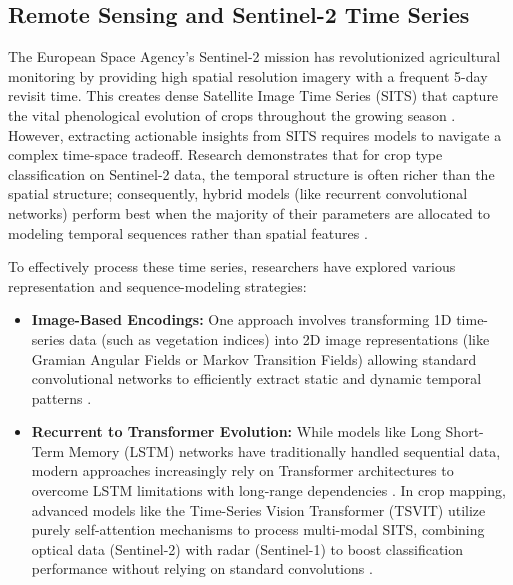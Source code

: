 \subsection{Remote Sensing and Sentinel-2 Time Series}
\label{subsec:rs_sentinel2}

The European Space Agency's Sentinel-2 mission has revolutionized agricultural monitoring by providing high spatial
resolution imagery with a frequent 5-day revisit time. This creates dense Satellite Image Time Series (SITS) that capture the
vital phenological evolution of crops throughout the growing season \cite{sainte_fare_garnot_time_2019}.
However, extracting actionable insights from SITS requires models to navigate a complex time-space tradeoff.
Research demonstrates that for crop type classification on Sentinel-2 data, the temporal structure is often richer than the spatial structure;
consequently, hybrid models (like recurrent convolutional networks) perform best when the majority of their parameters are allocated to modeling
temporal sequences rather than spatial features \cite{sainte_fare_garnot_time_2019}.

To effectively process these time series, researchers have explored various representation and sequence-modeling strategies:
\begin{itemize}
    \item \textbf{Image-Based Encodings:}
        One approach involves transforming 1D time-series data (such as vegetation indices) into 2D image representations (like Gramian Angular Fields
        or Markov Transition Fields) allowing standard convolutional networks to efficiently extract static and dynamic temporal patterns \cite{dias_image_2020}.
    \item \textbf{Recurrent to Transformer Evolution:}
        While models like Long Short-Term Memory (LSTM) networks have traditionally handled sequential data,
        modern approaches increasingly rely on Transformer architectures to overcome LSTM limitations with long-range dependencies \cite{zhou_improved_2024}.
        In crop mapping, advanced models like the Time-Series Vision Transformer (TSVIT) utilize purely self-attention mechanisms to process multi-modal SITS,
        combining optical data (Sentinel-2) with radar (Sentinel-1) to boost classification performance without relying on standard convolutions \cite{follath_multimodal_2024}.
\end{itemize}

